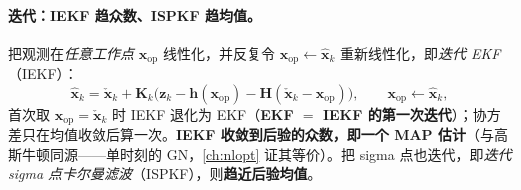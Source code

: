 \paragraph{迭代：IEKF 趋众数、ISPKF 趋均值。}
把观测在\emph{任意工作点} $\mathbf{x}_{\text{op}}$ 线性化，并反复令 $\mathbf{x}_{\text{op}}\leftarrow\hat{\mathbf{x}}_k$ 重新线性化，即\emph{迭代 EKF}（IEKF）\cite{barfoot2024state}：
\begin{equation}
  \hat{\mathbf{x}}_k=\check{\mathbf{x}}_k+\mathbf{K}_k\big(\mathbf{z}_k-\mathbf{h}(\mathbf{x}_{\text{op}})-\mathbf{H}(\check{\mathbf{x}}_k-\mathbf{x}_{\text{op}})\big),\qquad
  \mathbf{x}_{\text{op}}\leftarrow\hat{\mathbf{x}}_k,
  \label{eq:iekf}
\end{equation}
首次取 $\mathbf{x}_{\text{op}}=\check{\mathbf{x}}_k$ 时 IEKF 退化为 EKF（\textbf{EKF $=$ IEKF 的第一次迭代}）；协方差只在均值收敛后算一次。\textbf{IEKF 收敛到后验的众数，即一个 MAP 估计}（与高斯牛顿同源——单时刻的 GN，\cref{ch:nlopt} 证其等价）。把 sigma 点也迭代，即\emph{迭代 sigma 点卡尔曼滤波}（ISPKF\cite{barfoot2024state}），则\textbf{趋近后验均值}。

